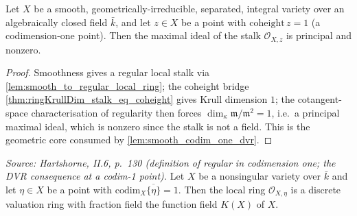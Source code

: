 \begin{lemma}\leanok
  \label{lem:smooth_codim_one_maximalIdeal_principal}
  Let \(X\) be a smooth, geometrically-irreducible, separated, integral variety over an
  algebraically closed field \(\bar k\), and let \(z \in X\) be a point with
  \(\mathrm{coheight}\,z = 1\) (a codimension-one point). Then the maximal ideal of the
  stalk \(\mathcal O_{X,z}\) is principal and nonzero.
\end{lemma}

\begin{proof}
  Smoothness gives a regular local stalk via
  \cref{lem:smooth_to_regular_local_ring}; the coheight bridge
  \cref{thm:ringKrullDim_stalk_eq_coheight} gives Krull dimension \(1\); the
  cotangent-space characterisation of regularity then forces
  \(\dim_\kappa \mathfrak m/\mathfrak m^2 = 1\), i.e.\ a principal maximal ideal, which
  is nonzero since the stalk is not a field. This is the geometric core consumed by
  \cref{lem:smooth_codim_one_dvr}.
\end{proof}

\begin{lemma}\leanok
  \label{lem:smooth_codim_one_dvr}
  \textit{Source: Hartshorne, II.6, p.~130 (definition of regular in codimension one;
  the DVR consequence at a codim-1 point).}
  Let \(X\) be a nonsingular variety over \(\bar k\) and let \(\eta \in X\) be a point with
  \(\mathrm{codim}_X \overline{\{\eta\}} = 1\). Then the local ring \(\mathcal O_{X, \eta}\) is a
  discrete valuation ring with fraction field the function field \(K(X)\) of \(X\).
\end{lemma}

